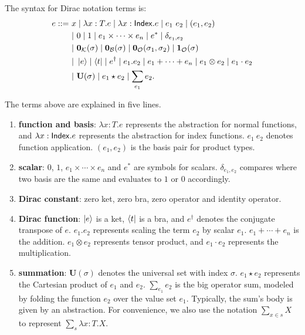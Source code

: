\begin{definition}
    The syntax for Dirac notation terms is:
    \begin{align*}
        e ::=\ & x \mid \lambda x : T.e \mid \lambda x : \mathsf{Index}.e \mid e_1\ e_2 \mid (e_1, e_2) \\
        & |\ 0 \mid 1 \mid e_1 \times \cdots \times e_n \mid e^* \mid \delta_{e_1, e_2} \\
        & |\ \mathbf{0}_\mathcal{K}(\sigma) \mid \mathbf{0}_\mathcal{B}(\sigma) \mid \mathbf{0}_\mathcal{O}(\sigma_1, \sigma_2) \mid \mathbf{1}_\mathcal{O}(\sigma) \\
        & |\ \ket{e} \mid \bra{t} \mid e^\dagger \mid e_1.e_2 \mid e_1 + \cdots + e_n \mid e_1 \otimes e_2 \mid e_1 \cdot e_2 \\
        & |\ \mathbf{U}(\sigma) \mid e_1 \star e_2 \mid \sum_{e_1} e_2.
    \end{align*}
\end{definition}
The terms above are explained in five lines.
\begin{enumerate}
    \item \textbf{function and basis}: \( \lambda x : T.e \) represents the abstraction for normal functions, and \( \lambda x : \mathsf{Index}.e \) represents the abstraction for index functions.
    \( e_1\ e_2 \) denotes function application.
    \( (e_1, e_2) \) is the basis pair for product types.
    \item \textbf{scalar}: \( 0 \), \( 1 \), \( e_1 \times \cdots \times e_n \) and \( e^* \) are symbols for scalars.
    \( \delta_{e_1, e_2} \) compares where two basis are the same and evaluates to $1$ or $0$ accordingly.
    \item \textbf{Dirac constant}: zero ket, zero bra, zero operator and identity operator.
    \item \textbf{Dirac function}: \( \ket{e} \) is a ket, \( \bra{t} \) is a bra, and \( e^\dagger \) denotes the conjugate transpose of \( e \). \( e_1.e_2 \) represents scaling the term \( e_2 \) by scalar \( e_1 \). \(e_1 + \cdots + e_n\) is the addition. \( e_1 \otimes e_2 \) represents tensor product, and \( e_1 \cdot e_2 \) represents the multiplication.
    \item \textbf{summation}: \( \mathbf{U}(\sigma) \) denotes the universal set with index \( \sigma \). \( e_1 \star e_2 \) represents the Cartesian product of \( e_1 \) and \( e_2 \). \( \sum_{e_1} e_2 \) is the big operator sum, modeled by folding the function \( e_2 \) over the value set \( e_1 \). Typically, the sum's body is given by an abstraction. For convenience, we also use the notation \( \sum_{x \in s} X \) to represent \( \sum_{s} \lambda x : T . X \).
\end{enumerate}

